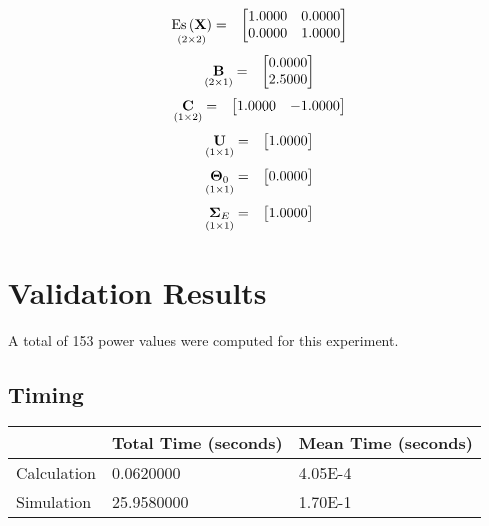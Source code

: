 \documentclass{glimmpse-report}
\begin{document}
\begin{eqnarray*}
\underset{\left(2\times2\right)}{\text{Es}\left(\mathbf{X}\right)} & = & \begin{bmatrix}1.0000 & 0.0000\protect\\
0.0000 & 1.0000\protect\\
\end{bmatrix}
\end{eqnarray*}
\begin{eqnarray*}
\underset{\left(2\times1\right)}{\mathbf{B}} & = & \begin{bmatrix}0.0000\protect\\
2.5000\protect\\
\end{bmatrix}
\end{eqnarray*}
\begin{eqnarray*}
\underset{\left(1\times2\right)}{\mathbf{C}} & = & \begin{bmatrix}1.0000 & -1.0000\protect\\
\end{bmatrix}
\end{eqnarray*}
\begin{eqnarray*}
\underset{\left(1\times1\right)}{\mathbf{U}} & = & \begin{bmatrix}1.0000\protect\\
\end{bmatrix}
\end{eqnarray*}
\begin{eqnarray*}
\underset{\left(1\times1\right)}{\mathbf{\Theta}_0} & = & \begin{bmatrix}0.0000\protect\\
\end{bmatrix}
\end{eqnarray*}
\begin{eqnarray*}
\underset{\left(1\times1\right)}{\mathbf{\Sigma}_E} & = & \begin{bmatrix}1.0000\protect\\
\end{bmatrix}
\end{eqnarray*}
\section{Validation Results}
A total of 153 power values were computed for this experiment.

\subsection{Timing}
\begin{tabular}{|l|l|l|}
\hline
 & Total Time (seconds) & Mean Time (seconds) \\ 
\hline
Calculation & 0.0620000 & 4.05E-4\tabularnewline
\hline
Simulation & 25.9580000 & 1.70E-1\tabularnewline
\hline
\end{tabular}
\end{document}
